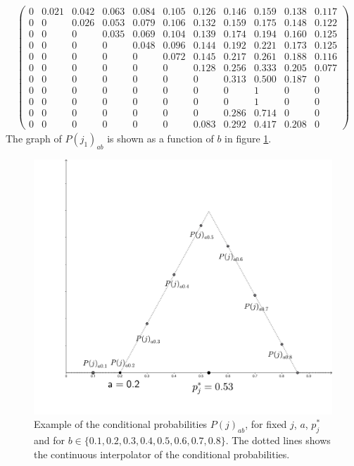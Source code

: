 \documentclass{article}
\begin{document}
\begin{align*}
	\begin{pmatrix}
		0     & 0.021 & 0.042 & 0.063 & 0.084 & 0.105 & 0.126 & 0.146 & 0.159 & 0.138 & 0.117 \\
		0     & 0     & 0.026 & 0.053 & 0.079 & 0.106 & 0.132 & 0.159 & 0.175 & 0.148 & 0.122 \\
		0     & 0     & 0     & 0.035 & 0.069 & 0.104 & 0.139 & 0.174 & 0.194 & 0.160 & 0.125 \\
		0     & 0     & 0     & 0     & 0.048 & 0.096 & 0.144 & 0.192 & 0.221 & 0.173 & 0.125 \\
		0     & 0     & 0     & 0     & 0     & 0.072 & 0.145 & 0.217 & 0.261 & 0.188 & 0.116 \\
		0     & 0     & 0     & 0     & 0     & 0     & 0.128 & 0.256 & 0.333 & 0.205 & 0.077 \\
		0     & 0     & 0     & 0     & 0     & 0     & 0     & 0.313 & 0.500 & 0.187 & 0     \\
		0     & 0     & 0     & 0     & 0     & 0     & 0     & 0     & 1     & 0     & 0     \\
		0     & 0     & 0     & 0     & 0     & 0     & 0     & 0     & 1     & 0     & 0     \\
		0     & 0     & 0     & 0     & 0     & 0     & 0     & 0.286 & 0.714 & 0     & 0     \\
		0     & 0     & 0     & 0     & 0     & 0     & 0.083 & 0.292 & 0.417 & 0.208 & 0
	\end{pmatrix}
\end{align*}
The graph of $P(j_1)_{ab}$ is shown as a function of $b$ in figure \ref{fig:function}.\par

\begin{figure}[h!]
    \centering
    \includegraphics[width = 14 cm]{img/geogebra-export (5).pdf}
    \caption{Example of the conditional probabilities $P(j)_{ab}$, for fixed $j$, $a$, $p^*_j$ and for $b \in \{0.1, 0.2, 0.3, 0.4, 0.5, 0.6, 0.7, 0.8\}$. The dotted lines shows the continuous interpolator of the conditional probabilities.}
	\label{fig:function}
\end{figure} 
\end{document}
